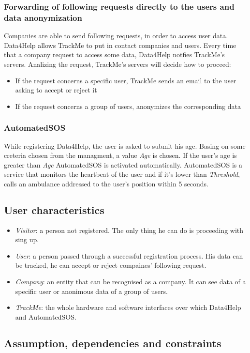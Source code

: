 \documentclass{article}
\begin{document}
\subsubsection{Forwarding of following requests directly to the users and data anonymization}
Companies are able to send following requests, in order to access user data. Data4Help allows TrackMe to put in contact companies and users. Every time that a company request to access some data, Data4Help notfies TrackMe's servers. Analizing the request, TrackMe's servers will decide how to proceed:\\
\begin{itemize}
\item If the request concerns a specific user, TrackMe sends an email to the user asking to accept or reject it
\item If the request concerns a group of users, anonymizes the corresponding data 
\end{itemize}
\subsubsection{AutomatedSOS}
While registering Data4Help, the user is asked to submit his age. Basing on some creteria chosen from the managment, a value \emph{Age} is chosen. If the user's age is greater than \emph{Age} AutomatedSOS is activated automatically. AutomatedSOS is a service that monitors the heartbeat of the user and if it's lower than \emph{Threshold}, calls an ambulance addressed to the user's position within 5 seconds.
\subsection{User characteristics}
\begin{itemize}
\item \emph{Visitor}: a person not registered. The only thing he can do is proceeding with sing up.
\item \emph{User}: a person passed through a successful registration process. His data can be tracked, he can accept or reject compaines' following request.
 \item \emph{Company}: an entity that can be recognised as a company. It can see data of a specific user or anonimous data of a group of users. 
 \item \emph{TrackMe}: the whole hardware and software interfaces over which Data4Help and AutomatedSOS.
\end{itemize}
\subsection{Assumption, dependencies and constraints}
\end{document}
